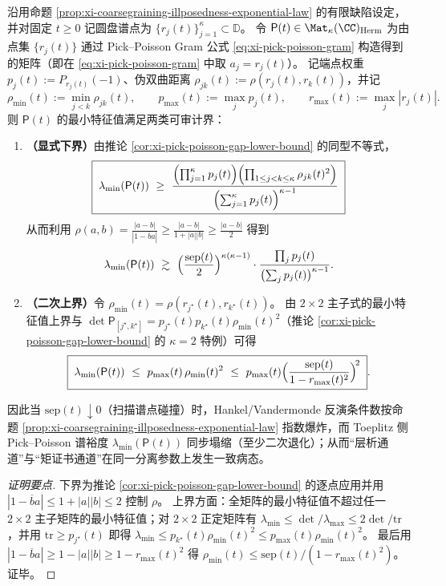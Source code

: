 \begin{proposition}\label{prop:xi-scan-toeplitz-conditioning-by-separation}
沿用命题 \ref{prop:xi-coarsegraining-illposedness-exponential-law} 的有限缺陷设定，并对固定 \(t\ge 0\) 记圆盘谱点为 \(\{r_j(t)\}_{j=1}^{\kappa}\subset\mathbb{D}\)。
令 \(\mathsf P(t)\in\Mat_{\kappa}(\CC)_{\mathrm{Herm}}\) 为由点集 \(\{r_j(t)\}\) 通过 Pick--Poisson Gram 公式 \eqref{eq:xi-pick-poisson-gram} 构造得到的矩阵（即在 \eqref{eq:xi-pick-poisson-gram} 中取 \(a_j=r_j(t)\)）。
记端点权重 \(p_j(t):=P_{r_j(t)}(-1)\)、伪双曲距离 \(\rho_{jk}(t):=\rho(r_j(t),r_k(t))\)，并记
\[
\rho_{\min}(t):=\min_{j<k}\rho_{jk}(t),\qquad
p_{\max}(t):=\max_j p_j(t),\qquad
r_{\max}(t):=\max_j|r_j(t)|.
\]
则 \(\mathsf P(t)\) 的最小特征值满足两类可审计界：
\begin{enumerate}
  \item \textbf{（显式下界）}由推论 \ref{cor:xi-pick-poisson-gap-lower-bound} 的同型不等式，
  \[
  \boxed{\;
  \lambda_{\min}(\mathsf P(t))
  \ \ge\
  \frac{\Bigl(\prod_{j=1}^{\kappa}p_j(t)\Bigr)\Bigl(\prod_{1\le j<k\le\kappa}\rho_{jk}(t)^2\Bigr)}
  {\Bigl(\sum_{j=1}^{\kappa}p_j(t)\Bigr)^{\kappa-1}}\;}
  \]
  从而利用 \(\rho(a,b)=\frac{|a-b|}{|1-\overline b a|}\ge \frac{|a-b|}{1+|a||b|}\ge \frac{|a-b|}{2}\) 得到
  \[
  \lambda_{\min}(\mathsf P(t))
  \ \gtrsim\
  \Bigl(\frac{\mathrm{sep}(t)}{2}\Bigr)^{\kappa(\kappa-1)}
  \cdot
  \frac{\prod_j p_j(t)}{\bigl(\sum_j p_j(t)\bigr)^{\kappa-1}}.
  \]
  \item \textbf{（二次上界）}令 \(\rho_{\min}(t)=\rho(r_{j^\star}(t),r_{k^\star}(t))\)。
  由 \(2\times 2\) 主子式的最小特征值上界与 \(\det\mathsf P_{[j^\star,k^\star]}=p_{j^\star}(t)p_{k^\star}(t)\rho_{\min}(t)^2\)（推论 \ref{cor:xi-pick-poisson-gap-lower-bound} 的 \(\kappa=2\) 特例）可得
  \[
  \boxed{\;
  \lambda_{\min}(\mathsf P(t))
  \ \le\
  p_{\max}(t)\,\rho_{\min}(t)^2
  \ \le\
  p_{\max}(t)\Bigl(\frac{\mathrm{sep}(t)}{1-r_{\max}(t)^2}\Bigr)^{\!2}\; }.
  \]
\end{enumerate}
因此当 \(\mathrm{sep}(t)\downarrow 0\)（扫描谱点碰撞）时，Hankel/Vandermonde 反演条件数按命题 \ref{prop:xi-coarsegraining-illposedness-exponential-law} 指数爆炸，而 Toeplitz 侧 Pick--Poisson 谱裕度 \(\lambda_{\min}(\mathsf P(t))\) 同步塌缩（至少二次退化）；从而“层析通道”与“矩证书通道”在同一分离参数上发生一致病态。
\end{proposition}
\begin{proof}[证明要点]
下界为推论 \ref{cor:xi-pick-poisson-gap-lower-bound} 的逐点应用并用 \(|1-\overline b a|\le 1+|a||b|\le 2\) 控制 \(\rho\)。
上界方面：全矩阵的最小特征值不超过任一 \(2\times 2\) 主子矩阵的最小特征值；对 \(2\times 2\) 正定矩阵有 \(\lambda_{\min}\le \det/\lambda_{\max}\le 2\det/\mathrm{tr}\)，并用 \(\mathrm{tr}\ge p_{j^\star}(t)\) 即得 \(\lambda_{\min}\le p_{k^\star}(t)\rho_{\min}(t)^2\le p_{\max}(t)\rho_{\min}(t)^2\)。
最后用 \(|1-\overline b a|\ge 1-|a||b|\ge 1-r_{\max}(t)^2\) 得 \(\rho_{\min}(t)\le \mathrm{sep}(t)/(1-r_{\max}(t)^2)\)。证毕。
\end{proof}

